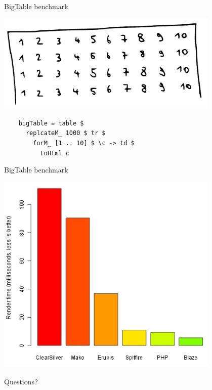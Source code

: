 \documentclass[20pt]{beamer}
\newcommand{\vspaced}{
    \vspace{5mm}
}
\begin{document}
\begin{frame}[fragile, b]{BigTable benchmark}
    \begin{center}
    \includegraphics[width=0.8\textwidth]{images/bigtable.pdf}
    \end{center}
    \begin{lstlisting}
    bigTable = table $
      replcateM_ 1000 $ tr $
        forM_ [1 .. 10] $ \c -> td $
          toHtml c
    \end{lstlisting}
    \vspaced
\end{frame}

\begin{frame}{BigTable benchmark}
    \begin{center}
    \includegraphics[width=0.8\textwidth]{images/benchmarks.png}
    \end{center}
\end{frame}

\begin{frame}[plain]
    \begin{center}
    \large{Questions?}
    \end{center}
\end{frame}
\end{document}
